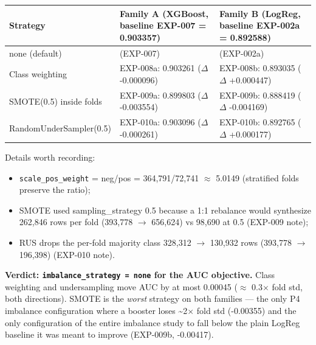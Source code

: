 \documentclass[11pt,a4paper]{article}
\providecommand{\tightlist}{\setlength{\itemsep}{2pt}\setlength{\parskip}{0pt}}
\begin{document}
{\def\LTcaptype{none} %

\begin{center}\small
\begin{tabular}{@{}
  >{\raggedright\arraybackslash}p{}
  >{\raggedright\arraybackslash}p{}
  >{\raggedright\arraybackslash}p{}@{}}
\toprule\noalign{}
\begin{minipage}[b]{\linewidth}\raggedright
Strategy
\end{minipage} & \begin{minipage}[b]{\linewidth}\raggedright
Family A (XGBoost, baseline EXP-007 = 0.903357)
\end{minipage} & \begin{minipage}[b]{\linewidth}\raggedright
Family B (LogReg, baseline EXP-002a = 0.892588)
\end{minipage} \\
\midrule\noalign{}
none (default) & 0.903357 (EXP-007) & 0.892588 (EXP-002a) \\
Class weighting & EXP-008a: 0.903261 ($\Delta$ -0.000096) & EXP-008b: 0.893035
($\Delta$ +0.000447) \\
SMOTE(0.5) inside folds & EXP-009a: 0.899803 ($\Delta$ -0.003554) & EXP-009b:
0.888419 ($\Delta$ -0.004169) \\
RandomUnderSampler(0.5) & EXP-010a: 0.903096 ($\Delta$ -0.000261) & EXP-010b:
0.892765 ($\Delta$ +0.000177) \\
\bottomrule
\end{tabular}
\end{center}

}

Details worth recording:

\begin{itemize}
\tightlist
\item
  \texttt{scale\_pos\_weight} = neg/pos = 364,791/72,741 $\approx$ 5.0149
  (stratified folds preserve the ratio);
\item
  SMOTE used sampling\_strategy 0.5 because a 1:1 rebalance would
  synthesize 262,846 rows per fold (393,778 $\rightarrow$ 656,624) vs 98,690 at 0.5
  (EXP-009 note);
\item
  RUS drops the per-fold majority class 328,312 $\rightarrow$ 130,932 rows (393,778
  $\rightarrow$ 196,398) (EXP-010 note).
\end{itemize}

\textbf{Verdict: \texttt{imbalance\_strategy\ =\ none} for the AUC
objective.} Class weighting and undersampling move AUC by at most
0.00045 ($\approx$ 0.3$\times$ fold std, both directions). SMOTE is the \emph{worst}
strategy on both families --- the only P4 imbalance configuration where
a booster loses \textasciitilde2$\times$ fold std (-0.00355) and the only
configuration of the entire imbalance study to fall below the plain
LogReg baseline it was meant to improve (EXP-009b, -0.00417).
\end{document}
